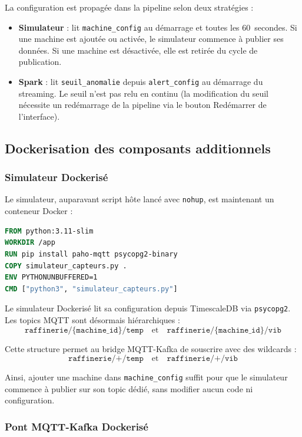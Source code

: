 \documentclass[12pt,a4paper]{article}
\begin{document}
La configuration est propagée dans la pipeline selon deux stratégies :

\begin{itemize}
    \item \textbf{Simulateur} : lit \texttt{machine\_config} au démarrage et toutes les 60~secondes. Si une machine est ajoutée ou activée, le simulateur commence à publier ses données. Si une machine est désactivée, elle est retirée du cycle de publication.
    \item \textbf{Spark} : lit \texttt{seuil\_anomalie} depuis \texttt{alert\_config} au démarrage du streaming. Le seuil n'est pas relu en continu (la modification du seuil nécessite un redémarrage de la pipeline via le bouton \og Redémarrer \fg{} de l'interface).
\end{itemize}

\subsection{Dockerisation des composants additionnels}

\subsubsection{Simulateur Dockerisé}

Le simulateur, auparavant script hôte lancé avec \texttt{nohup}, est maintenant un conteneur Docker :

\begin{lstlisting}[language=Dockerfile,caption={Dockerfile du simulateur}]
FROM python:3.11-slim
WORKDIR /app
RUN pip install paho-mqtt psycopg2-binary
COPY simulateur_capteurs.py .
ENV PYTHONUNBUFFERED=1
CMD ["python3", "simulateur_capteurs.py"]
\end{lstlisting}

Le simulateur Dockerisé lit sa configuration depuis TimescaleDB via \texttt{psycopg2}. Les topics MQTT sont désormais hiérarchiques :
\[
\texttt{raffinerie/\{machine\_id\}/temp} \quad \text{et} \quad \texttt{raffinerie/\{machine\_id\}/vib}
\]

Cette structure permet au bridge MQTT-Kafka de souscrire avec des wildcards :
\[
\texttt{raffinerie/+/temp} \quad \text{et} \quad \texttt{raffinerie/+/vib}
\]

Ainsi, ajouter une machine dans \texttt{machine\_config} suffit pour que le simulateur commence à publier sur son topic dédié, sans modifier aucun code ni configuration.

\subsubsection{Pont MQTT-Kafka Dockerisé}
\end{document}
